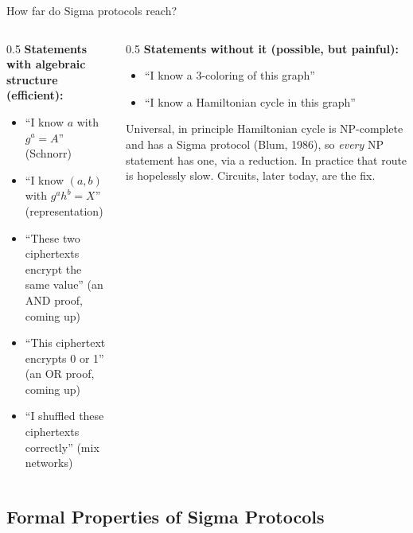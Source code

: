 \ifdefined\PRESENTATION\else\PassOptionsToClass{handout}{beamer}\fi\documentclass[aspectratio=169, lualatex]{beamer}
\begin{document}
\begin{frame}{How far do Sigma protocols reach?}
	\begin{columns}[c]
		\begin{column}{0.5\textwidth}
			\textbf{Statements with algebraic structure (efficient):}
			\begin{itemize}
				\item ``I know $a$ with $g^a = A$'' (Schnorr)
				\item ``I know $(a, b)$ with $g^a h^b = X$'' (representation)
				\item ``These two ciphertexts encrypt the same value'' (an AND proof, coming up)
				\item ``This ciphertext encrypts 0 or 1'' (an OR proof, coming up)
				\item ``I shuffled these ciphertexts correctly'' (mix networks)
			\end{itemize}
		\end{column}
		\begin{column}{0.5\textwidth}
			\textbf{Statements without it (possible, but painful):}
			\begin{itemize}
				\item ``I know a 3-coloring of this graph''
				\item ``I know a Hamiltonian cycle in this graph''
			\end{itemize}
			\begin{alertblock}{Universal, in principle}
				Hamiltonian cycle is NP-complete and has a Sigma protocol (Blum, 1986), so \textit{every} NP statement has one, via a reduction. In practice that route is hopelessly slow. Circuits, later today, are the fix.
			\end{alertblock}
		\end{column}
	\end{columns}
\end{frame}

\subsection{Formal Properties of Sigma Protocols}
\end{document}
